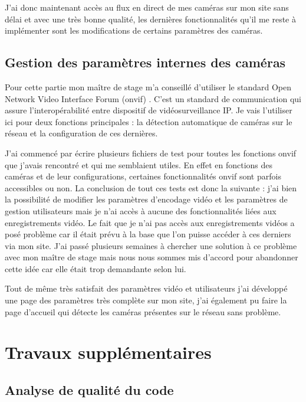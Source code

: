 J'ai donc maintenant accès au flux en direct de mes caméras sur mon site sans délai et avec une très bonne qualité, les dernières fonctionnalités qu'il me reste à implémenter sont les modifications de certains paramètres des caméras.

\section{Gestion des paramètres internes des caméras}

Pour cette partie mon maître de stage m'a conseillé d'utiliser le standard Open Network Video Interface Forum (\acrshort{onvif}) \cite{onvif}. C'est un standard de communication qui assure l'interopérabilité entre dispositif de vidéosurveillance IP. Je vais l'utiliser ici pour deux fonctions principales : la détection automatique de caméras sur le réseau et la configuration de ces dernières.

J'ai commencé par écrire plusieurs fichiers de test pour toutes les fonctions \acrshort{onvif} que j'avais rencontré et qui me semblaient utiles. En effet en fonctions des caméras et de leur configurations, certaines fonctionnalités \acrshort{onvif} sont parfois accessibles ou non. La conclusion de tout ces tests est donc la suivante : j'ai bien la possibilité de modifier les paramètres d'encodage vidéo et les paramètres de gestion utilisateurs mais je n'ai accès à aucune des fonctionnalités liées aux enregistrements vidéo. Le fait que je n'ai pas accès aux enregistrements vidéos a posé problème car il était prévu à la base que l'on puisse accéder à ces derniers via mon site. J'ai passé plusieurs semaines à chercher une solution à ce problème avec mon maître de stage mais nous nous sommes mis d'accord pour abandonner cette idée car elle était trop demandante selon lui.

Tout de même très satisfait des paramètres vidéo et utilisateurs j'ai développé une page des paramètres très complète sur mon site, j'ai également pu faire la page d'accueil qui détecte les caméras présentes sur le réseau sans problème. 


\newpage
\chapter{Travaux supplémentaires}

\section{Analyse de qualité du code}

